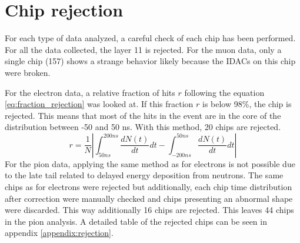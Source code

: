 \section{Chip rejection}

For each type of data analyzed, a careful check of each chip has been performed. For all the data collected, the layer 11 is rejected. For the muon data, only a single chip (157) shows a strange behavior likely because the IDACs on this chip were broken.

For the electron data, a relative fraction of hits $r$ following the equation \ref{eq:fraction_rejection} was looked at. If this fraction $r$ is below 98\%, the chip is rejected. This means that most of the hits in the event are in the core of the distribution between -50 and 50 ns. With this method, 20 chips are rejected.
\begin{equation} \label{eq:fraction_rejection}
	r = \frac{1}{N} \left|\int_{50 ns}^{200 ns} \frac{dN(t)}{dt} dt - \int_{-200 ns}^{50 ns} \frac{dN(t)}{dt} dt\right|
\end{equation}
For the pion data, applying the same method as for electrons is not possible due to the late tail related to delayed energy deposition from neutrons. The same chips as for electrons were rejected but additionally, each chip time distribution after correction were manually checked and chips presenting an abnormal shape were discarded. This way additionally 16 chips are rejected. This leaves 44 chips in the pion analysis. A detailed table of the rejected chips can be seen in appendix \ref{appendix:rejection}.


